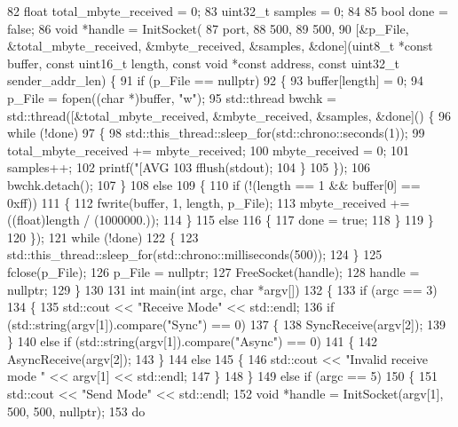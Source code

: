 \begin{DoxyCode}
82     float total\_mbyte\_received = 0;
83     uint32\_t samples = 0;
84 
85     bool done = false;
86     void *handle = InitSocket(
87         port,
88         500,
89         500,
90         [&p\_File, &total\_mbyte\_received, &mbyte\_received, &samples, &done](uint8\_t *const buffer, const
       uint16\_t length, const void *const address, const uint32\_t sender\_addr\_len) \{
91             if (p\_File == nullptr)
92             \{
93                 buffer[length] = 0;
94                 p\_File = fopen((char *)buffer, "w");
95                 std::thread bwchk = std::thread([&total\_mbyte\_received, &mbyte\_received, &samples, &done]()
       \{
96                     while (!done)
97                     \{
98                         std::this\_thread::sleep\_for(std::chrono::seconds(1));
99                         total\_mbyte\_received += mbyte\_received;
100                         mbyte\_received = 0;
101                         samples++;
102                         printf("[AVG %
103                         fflush(stdout);
104                     \}
105                 \});
106                 bwchk.detach();
107             \}
108             else
109             \{
110                 if (!(length == 1 && buffer[0] == 0xff))
111                 \{
112                     fwrite(buffer, 1, length, p\_File);
113                     mbyte\_received += ((float)length / (1000000.));
114                 \}
115                 else
116                 \{
117                     done = true;
118                 \}
119             \}
120         \});
121     while (!done)
122     \{
123         std::this\_thread::sleep\_for(std::chrono::milliseconds(500));
124     \}
125     fclose(p\_File);
126     p\_File = nullptr;
127     FreeSocket(handle);
128     handle = nullptr;
129 \}
130 
131 int main(int argc, char *argv[])
132 \{
133     if (argc == 3)
134     \{
135         std::cout << "Receive Mode" << std::endl;
136         if (std::string(argv[1]).compare("Sync") == 0)
137         \{
138             SyncReceive(argv[2]);
139         \}
140         else if (std::string(argv[1]).compare("Async") == 0)
141         \{
142             AsyncReceive(argv[2]);
143         \}
144         else
145         \{
146             std::cout << "Invalid receive mode " << argv[1] << std::endl;
147         \}
148     \}
149     else if (argc == 5)
150     \{
151         std::cout << "Send Mode" << std::endl;
152         void *handle = InitSocket(argv[1], 500, 500, nullptr);
153         do

\end{DoxyCode}

